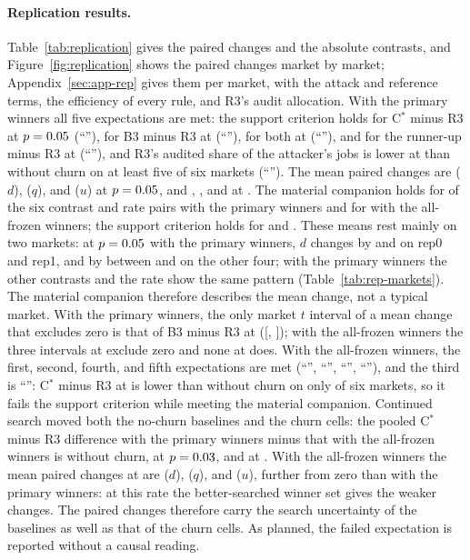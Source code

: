 \documentclass[11pt]{article}
\begin{document}
\paragraph{Replication results.} Table~\ref{tab:replication} gives the paired changes and the absolute contrasts, and Figure~\ref{fig:replication} shows the paired changes market by market; Appendix~\ref{sec:app-rep} gives them per market, with the attack and reference terms, the efficiency of every rule, and R3's audit allocation. With the primary winners all five expectations are met: the support criterion holds for C$^*$ minus R3 at $p = 0.05$ (``''), for B3 minus R3 at  (``''), for both at  (``''), and for the runner-up minus R3 at  (``''), and R3's audited share of the attacker's jobs is lower at  than without churn on at least five of six markets (``''). The mean paired changes are  ($d$),  ($q$), and  ($u$) at $p = 0.05$, and , , and  at . The material companion holds for  of the six contrast and rate pairs with the primary winners and for  with the all-frozen winners; the support criterion holds for  and . These means rest mainly on two markets: at $p = 0.05$ with the primary winners, $d$ changes by  and  on rep0 and rep1, and by between  and  on the other four; with the primary winners the other contrasts and the rate  show the same pattern (Table~\ref{tab:rep-markets}). The material companion therefore describes the mean change, not a typical market. With the primary winners, the only market $t$ interval of a mean change that excludes zero is that of B3 minus R3 at  ([, ]); with the all-frozen winners the three intervals at  exclude zero and none at  does. With the all-frozen winners, the first, second, fourth, and fifth expectations are met (``'', ``'', ``'', ``''), and the third is ``'': C$^*$ minus R3 at  is lower than without churn on only  of six markets, so it fails the support criterion while meeting the material companion. Continued search moved both the no-churn baselines and the churn cells: the pooled C$^*$ minus R3 difference with the primary winners minus that with the all-frozen winners is  without churn,  at $p = 0.03$, and  at . With the all-frozen winners the mean paired changes at  are  ($d$),  ($q$), and  ($u$), further from zero than with the primary winners: at this rate the better-searched winner set gives the weaker changes. The paired changes therefore carry the search uncertainty of the baselines as well as that of the churn cells. As planned, the failed expectation is reported without a causal reading.
\end{document}
